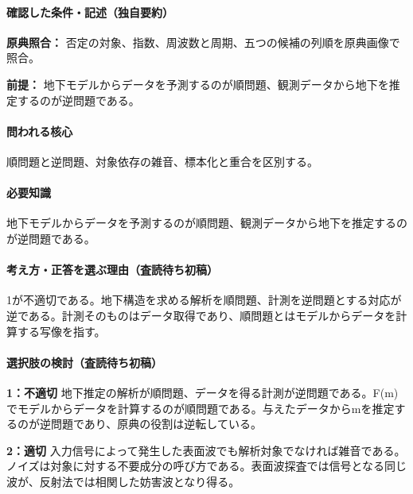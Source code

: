\paragraph{確認した条件・記述（独自要約）}\mbox{}\par

\noindent\textbf{原典照合：} 否定の対象、指数、周波数と周期、五つの候補の列順を原典画像で照合。\par

\noindent\textbf{前提：} 地下モデルからデータを予測するのが順問題、観測データから地下を推定するのが逆問題である。\par

\paragraph{問われる核心} 順問題と逆問題、対象依存の雑音、標本化と重合を区別する。

\paragraph{必要知識} 地下モデルからデータを予測するのが順問題、観測データから地下を推定するのが逆問題である。

\paragraph{考え方・正答を選ぶ理由（査読待ち初稿）} 1が不適切である。地下構造を求める解析を順問題、計測を逆問題とする対応が逆である。計測そのものはデータ取得であり、順問題とはモデルからデータを計算する写像を指す。

\paragraph{選択肢の検討（査読待ち初稿）}\mbox{}\par

\noindent\textbf{1：不適切} 地下推定の解析が順問題、データを得る計測が逆問題である。F(m)でモデルからデータを計算するのが順問題である。与えたデータからmを推定するのが逆問題であり、原典の役割は逆転している。\par

\noindent\textbf{2：適切} 入力信号によって発生した表面波でも解析対象でなければ雑音である。ノイズは対象に対する不要成分の呼び方である。表面波探査では信号となる同じ波が、反射法では相関した妨害波となり得る。\par

